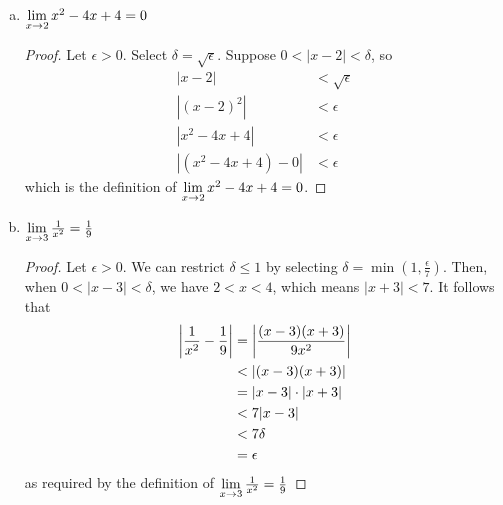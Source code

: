 \documentclass{agony}
\begin{document}
\begin{enumerate}[(a)]
\begin{proof}
        \end{proof}
  \item $\lim\limits_{x\to2} x^2-4x+4 = 0$
        \begin{proof}
          Let $\epsilon > 0$.
          Select $\delta = \sqrt{\epsilon}$.
          Suppose $0 < |x-2| < \delta$, so
          \begin{align*}
            |x-2|            & < \sqrt{\epsilon} \\
            |(x-2)^2|        & < \epsilon        \\
            |x^2-4x+4|       & < \epsilon        \\
            |(x^2-4x+4) - 0| & < \epsilon
          \end{align*}
          which is the \epsdel{} definition of $\lim\limits_{x\to2} x^2-4x+4 = 0$.
        \end{proof}
  \item $\lim\limits_{x\to3} \frac{1}{x^2} = \frac{1}{9}$
        \begin{proof}
          Let $\epsilon > 0$.
          We can restrict $\delta \leq 1$ by selecting $\delta = \min(1,\frac{\epsilon}{7})$.
          Then, when $0 < |x-3| < \delta$, we have $2 < x < 4$, which means $|x+3| < 7$.
          It follows that
          \begin{align*}
            \abs{\frac{1}{x^2}-\frac{1}{9}} & = \abs{\frac{(x-3)(x+3)}{9x^2}} \\
                                            & < \abs{(x-3)(x+3)}              \\
                                            & = \abs{x-3}\cdot\abs{x+3}       \\
                                            & < 7\abs{x-3}                    \\
                                            & < 7\delta                       \\
                                            & = \epsilon
          \end{align*}
          as required by the \epsdel{} definition of $\lim\limits_{x\to3} \frac{1}{x^2} = \frac{1}{9}$
        \end{proof}
\end{enumerate}
\end{document}
